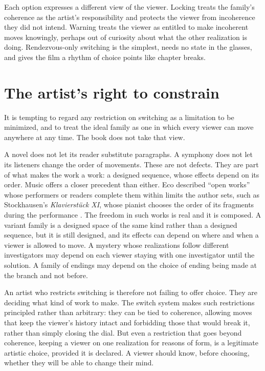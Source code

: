 Each option expresses a different view of the viewer. Locking treats the family's coherence as the artist's responsibility and protects the viewer from incoherence they did not intend. Warning treats the viewer as entitled to make incoherent moves knowingly, perhaps out of curiosity about what the other realization is doing. Rendezvous-only switching is the simplest, needs no state in the glasses, and gives the film a rhythm of choice points like chapter breaks.

\section{The artist's right to constrain}

It is tempting to regard any restriction on switching as a limitation to be minimized, and to treat the ideal family as one in which every viewer can move anywhere at any time. The book does not take that view.

A novel does not let its reader substitute paragraphs. A symphony does not let its listeners change the order of movements. These are not defects. They are part of what makes the work a work: a designed sequence, whose effects depend on its order. Music offers a closer precedent than either. Eco described ``open works'' whose performers or readers complete them within limits the author sets, such as Stockhausen's \emph{Klavierstück XI}, whose pianist chooses the order of its fragments during the performance \cite{eco}. The freedom in such works is real and it is composed. A variant family is a designed space of the same kind rather than a designed sequence, but it is still designed, and its effects can depend on where and when a viewer is allowed to move. A mystery whose realizations follow different investigators may depend on each viewer staying with one investigator until the solution. A family of endings may depend on the choice of ending being made at the branch and not before.

An artist who restricts switching is therefore not failing to offer choice. They are deciding what kind of work to make. The switch system makes such restrictions principled rather than arbitrary: they can be tied to coherence, allowing moves that keep the viewer's history intact and forbidding those that would break it, rather than simply closing the dial. But even a restriction that goes beyond coherence, keeping a viewer on one realization for reasons of form, is a legitimate artistic choice, provided it is declared. A viewer should know, before choosing, whether they will be able to change their mind.

